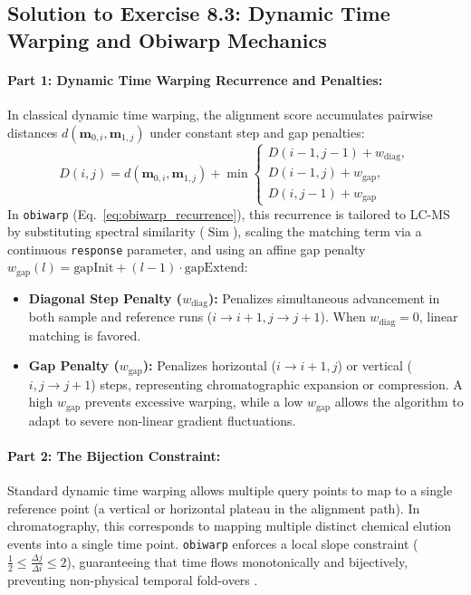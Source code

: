 \documentclass[11pt,twoside,openright]{book}
\begin{document}
\clearpage
\subsection*{Solution to Exercise 8.3: Dynamic Time Warping and Obiwarp Mechanics}

\paragraph{Part 1: Dynamic Time Warping Recurrence and Penalties:}
In classical dynamic time warping, the alignment score accumulates pairwise distances $d(\mathbf{m}_{0, i}, \mathbf{m}_{1, j})$ under constant step and gap penalties:
\begin{equation*}
D(i, j) = d(\mathbf{m}_{0, i}, \mathbf{m}_{1, j}) + \min \begin{cases}
D(i-1, j-1) + w_{\text{diag}}, \\
D(i-1, j) + w_{\text{gap}}, \\
D(i, j-1) + w_{\text{gap}}
\end{cases}
\end{equation*}
In \texttt{obiwarp} (Eq.~\ref{eq:obiwarp_recurrence}), this recurrence is tailored to LC-MS by substituting spectral similarity ($\operatorname{Sim}$), scaling the matching term via a continuous \texttt{response} parameter, and using an affine gap penalty $w_{\text{gap}}(l) = \text{gapInit} + (l-1)\cdot \text{gapExtend}$:
\begin{itemize}
    \item \textbf{Diagonal Step Penalty ($w_{\text{diag}}$):} Penalizes simultaneous advancement in both sample and reference runs ($i \to i+1, j \to j+1$). When $w_{\text{diag}} = 0$, linear matching is favored.
    \item \textbf{Gap Penalty ($w_{\text{gap}}$):} Penalizes horizontal ($i \to i+1, j$) or vertical ($i, j \to j+1$) steps, representing chromatographic expansion or compression. A high $w_{\text{gap}}$ prevents excessive warping, while a low $w_{\text{gap}}$ allows the algorithm to adapt to severe non-linear gradient fluctuations.
\end{itemize}

\paragraph{Part 2: The Bijection Constraint:}
Standard dynamic time warping allows multiple query points to map to a single reference point (a vertical or horizontal plateau in the alignment path). In chromatography, this corresponds to mapping multiple distinct chemical elution events into a single time point. \texttt{obiwarp} enforces a local slope constraint ($\frac{1}{2} \le \frac{\Delta j}{\Delta i} \le 2$), guaranteeing that time flows monotonically and bijectively, preventing non-physical temporal fold-overs \cite{prince2006chromatographic}.
\end{document}
